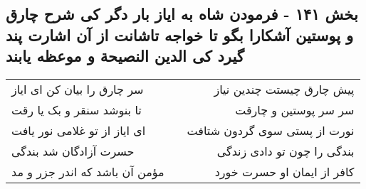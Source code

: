 \begin{center}
\section*{بخش ۱۴۱ - فرمودن شاه به ایاز بار دگر کی شرح چارق و پوستین آشکارا بگو تا خواجه تاشانت از آن اشارت پند گیرد کی الدین النصیحة و موعظه یابند}
\label{sec:sh141}
\begin{longtable}{l p{0.5cm} r}
سر چارق را بیان کن ای ایاز
&&
پیش چارق چیستت چندین نیاز
\\
تا بنوشد سنقر و بک یا رقت
&&
سر سر پوستین و چارقت
\\
ای ایاز از تو غلامی نور یافت
&&
نورت از پستی سوی گردون شتافت
\\
حسرت آزادگان شد بندگی
&&
بندگی را چون تو دادی زندگی
\\
مؤمن آن باشد که اندر جزر و مد
&&
کافر از ایمان او حسرت خورد
\\
\end{longtable}
\end{center}
